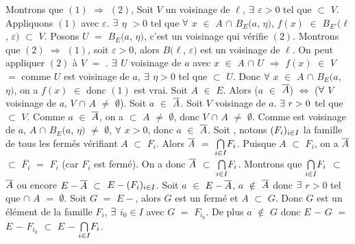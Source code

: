 \documentclass{article}
\begin{document}
\demo
Montrons que $(1)$ $\Longrightarrow$ $(2)$, Soit $V$ un voisinage de $\ell$, $\exists$  $\varepsilon>0$ tel que \Bo{\ell}{\varepsilon} $\subset$ $V$. Appliquons $(1)$ avec $\varepsilon$. \s $\exists$ $\eta$ $>0$ tel que $\forall$ $x$ $\in$ $A$ $\cap$ $B_E(a$, $\eta)$, $f(x)$ $\in$ $B_{E'}(\ell$, $\varepsilon)$ $\subset$ $V$. Posons $U$ $=$ $B_E(a$, $\eta)$, c'est un voisinage qui \s vérifie $(2)$. \s
Montrons que $(2)$ $\Longrightarrow$ $(1)$, soit $\varepsilon >0$, alors $B(\ell$, $\varepsilon)$ est un voisinage de $\ell$. On peut appliquer $(2)$ à \s $V$ $=$ \Bo{\ell}{\varepsilon}. 
$\exists$ $U$ voisinage de $a$ avec $x$ $\in$ $A$ $\cap$ $U$ $\Longrightarrow$ $f(x)$ $\in$ $V$ $=$ \Bo{\ell}{\varepsilon} comme $U$ est voisinage de $a$, \s $\exists$ $\eta>0$ tel que  $\subset$ $U$. Donc $\forall$ $x$ $\in$ $A$ $\cap$ $B_E(a$, $\eta)$, on a $f(x)$ $\in$ \Bo{\ell}{\varepsilon} donc $(1)$ est vrai.
\proposition
Soit $A$ $\in$ $E$. Alors ($a$ $\in$ $\overline{A}$) $\Longleftrightarrow$ ($\forall$ $V$ voisinage de $a$, $V$ $\cap$ $A$ $\neq$ $\emptyset$).
\demo
\fbox{$\Longrightarrow$} Soit $a$ $\in$ $\overline{A}$. Soit $V$ voisinage de $a$. $\exists \text{ }r>0$ tel que  $\subset$ $V$. Comme $a$ $\in$ $\overline{A}$, on a  $\subset$ $A$ $\neq$ $\emptyset$, \s donc $V$ $\cap$ $A$ $\neq$ $\emptyset$.
\fbox{$\Longleftarrow$} Comme  est voisinage de $a$, $A$ $\cap$ $B_E(a$, $\eta)$ $\neq$ $\emptyset$, $\forall$ $x>0$, donc $a$ $\in$ $\overline{A}$.
\corollaire
Soit \ace, notons $(F_i)_{i \in I}$ la famille de tous les fermés vérifiant $A$ $\subset$ $F_i$. Alors $\overline{A}$ $=$ $\underset{i \in I}{\bigcap}F_i$.
\demo Puisque $A$ $\subset$ $F_i$, on a $\overline{A}$ $\subset$ $\overline{F_i}$ $=$ $F_i$ (car $F_i$ est fermé). On a donc $\overline{A}$ $\subset$ $\underset{i \in I}{\bigcap}F_i$. \s
Montrons que $\underset{i \in I}{\bigcap}F_i$ $\subset$ $\overline{A}$ ou encore $E - \overline{A}$ $\subset$ $E - (F_i)_{i \in I}$.
Soit $a$ $\in$ $E - \overline{A}$, $a$ $\notin$ $\overline{A}$ donc $\exists$ $r>0$ tel que \s  $\cap$ $A$ $=$ $\emptyset$. Soit $G$ $=$ $E -$, alors $G$ est un fermé et $A$ $\subset$ $G$. Donc $G$ est un élément de la famille $F_i$, \s $\exists$ $i_0 \in I$ avec $G$ $=$ $F_{i_{0}}$. De plus $a$ $\notin$ $G$ donc $E$ $-$ $G$ $=$ $E$ $-$ $F_{i_{0}}$ $\subset$ $E$ $-$  $\underset{i \in I}{\bigcap}F_i$.
\end{document}
